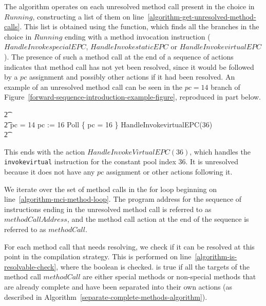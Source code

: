 The algorithm operates on each unresolved method call present in the
choice in $Running$, constructing a list of them on
line~\ref{algorithm-get-unresolved-method-calls}.
This list is obtained using the 
function, which finds all the branches in the choice in $Running$
ending with a method invocation instruction ($HandleInvokespecialEPC$,
$HandleInvokestaticEPC$ or $HandleInvokevirtualEPC$).
The presence of such a method call at the end of a sequence of actions
indicates that method call has not yet been resolved, since it would
be followed by a $pc$ assignment and possibly other actions if it had
been resolved.
An example of an unresolved method call can be seen in the $pc = 14$
branch of Figure~\ref{forward-sequence-introduction-example-figure},
reproduced in part below.
\begin{circusaction}
  \t2 {} \cdots {} \\
  \t2 {} \circelse pc = 14 \circthen \cdots \circseq pc := 16 \circseq Poll \circseq \{ pc = 16 \} \circseq HandleInvokevirtualEPC(36) \\
  \t2 {} \cdots {}
\end{circusaction}
This ends with the action $HandleInvokeVirtualEPC(36)$, which handles
the \texttt{invokevirtual} instruction for the constant pool index
$36$.
It is unresolved because it does not have any $pc$ assignment or other
actions following it.

We iterate over the set of method calls in the for loop beginning on
line~\ref{algorithm-mci-method-loop}.
The program address for the sequence of instructions ending in the
unresolved method call is referred to as $methodCallAddress$, and the
method call action at the end of the sequence is referred to as
$methodCall$.

For each method call that needs resolving, we check if it can be
resolved at this point in the compilation strategy.
This is performed on line~\ref{algorithm-is-resolvable-check}, where
the boolean  is checked.
 is true if all the targets of the
method call $methodCall$ are either special methods or non-special
methods that are already complete and have been separated into their
own actions (as described in
Algorithm~\ref{separate-complete-methods-algorithm}).


